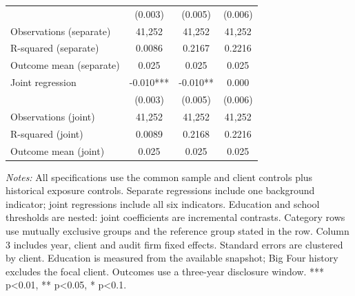 \documentclass[10pt]{article}
\begin{document}
\begin{minipage}{19cm}
\begin{threeparttable}
\begin{tabular}{p{}ccc}
 & (0.003) & (0.005) & (0.006) \\
Observations (separate) & 41,252 & 41,252 & 41,252 \\
R-squared (separate) & 0.0086 & 0.2167 & 0.2216 \\
Outcome mean (separate) & 0.025 & 0.025 & 0.025 \\
Joint regression & -0.010*** & -0.010** & 0.000 \\
 & (0.003) & (0.005) & (0.006) \\
Observations (joint) & 41,252 & 41,252 & 41,252 \\
R-squared (joint) & 0.0089 & 0.2168 & 0.2216 \\
Outcome mean (joint) & 0.025 & 0.025 & 0.025 \\
\bottomrule
\end{tabular}
\begin{tablenotes}\fontsize{9}{11}\selectfont
\item \raggedright \fontsize{9}{11}\selectfont \textit{Notes:} All specifications use the common sample and client controls plus historical exposure controls. Separate regressions include one background indicator; joint regressions include all six indicators. Education and school thresholds are nested: joint coefficients are incremental contrasts. Category rows use mutually exclusive groups and the reference group stated in the row. Column 3 includes year, client and audit firm fixed effects. Standard errors are clustered by client. Education is measured from the available snapshot; Big Four history excludes the focal client. Outcomes use a three-year disclosure window. *** p<0.01, ** p<0.05, * p<0.1.
\end{tablenotes}
\end{threeparttable}

\end{minipage}
\end{document}
